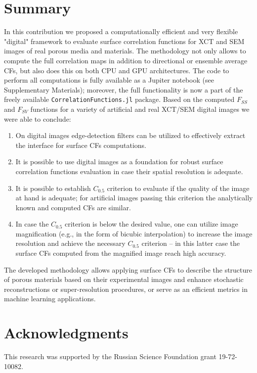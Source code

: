 \documentclass[reprint,amsmath,amssymb,aps,pre,showkeys,showpacs]{revtex4-1}
\newcommand{\code}[1]{\colorbox{light-gray}{\texttt{#1}}}
\begin{document}
\section{Summary}
\label{sec:summary}
In this contribution we proposed a computationally efficient and very flexible
"digital" framework to evaluate surface correlation functions for XCT and SEM
images of real porous media and materials. The methodology not only allows to
compute the full correlation maps in addition to directional or ensemble average
CFs, but also does this on both CPU and GPU architectures. The code to perform
all computations is fully available as a Jupiter notebook (see Supplementary
Materials); moreover, the full functionality is now a part of the freely
available \code{CorrelationFunctions.jl} package. Based on the computed $F_{SS}$
and $F_{SV}$ functions for a variety of artificial and real XCT/SEM digital
images we were able to conclude:
\begin{enumerate}
  \item On digital images edge-detection filters can be utilized to effectively
    extract the interface for surface CFs computations.
  \item It is possible to use digital images as a foundation for robust surface
    correlation functions evaluation in case their spatial resolution is
    adequate.
  \item It is possible to establish $C_{0.5}$ criterion to evaluate if the
    quality of the image at hand is adequate; for artificial images passing this
    criterion the analytically known and computed CFs are similar.
  \item In case the $C_{0.5}$ criterion is below the desired value, one can
    utilize image magnification (e.g., in the form of bicubic interpolation) to
    increase the image resolution and achieve the necessary $C_{0.5}$ criterion
    -- in this latter case the surface CFs computed from the magnified image
    reach high accuracy.
\end{enumerate}
The developed methodology allows applying surface CFs to describe the structure
of porous materials based on their experimental images and enhance stochastic
reconstructions or super-resolution procedures, or serve as an efficient metrics
in machine learning applications.

\section{Acknowledgments}
This research was supported by the Russian Science Foundation grant
19-72-10082.
\end{document}

